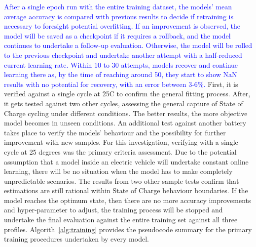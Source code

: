 %
\textcolor{blue}{
After a single epoch run with the entire training dataset, the models' mean average accuracy is compared with previous results to decide if retraining is necessary to foresight potential overfitting.
If an improvement is observed, the model will be saved as a checkpoint if it requires a rollback, and the model continues to undertake a follow-up evaluation.
Otherwise, the model will be rolled to the previous checkpoint and undertake another attempt with a half-reduced current learning rate.
Within 10 to 30 attempts, models recover and continue learning there as, by the time of reaching around 50, they start to show NaN results with no potential for recovery, with an error between 3-6\%.
}
%
First, it is verified against a single cycle at 25\textdegree{}C to confirm the general fitting process.
After, it gets tested against two other cycles, assessing the general capture of State of Charge cycling under different conditions.
The better results, the more objective model becomes in unseen conditions.
An additional test against another battery takes place to verify the models' behaviour and the possibility for further improvement with new samples.
For this investigation, verifying with a single cycle at 25 degrees was the primary criteria assessment.
Due to the potential assumption that a model inside an electric vehicle will undertake constant online learning, there will be no situation when the model has to make completely unpredictable scenarios.
The results from two other sample tests confirm that estimations are still rational within State of Charge behaviour boundaries.
If the model reaches the optimum state, then there are no more accuracy improvements and hyper-parameter to adjust, the training process will be stopped and undertake the final evaluation against the entire training set against all three profiles.
Algorith~\ref{alg:training} provides the pseudocode summary for the primary training procedures undertaken by every model.
